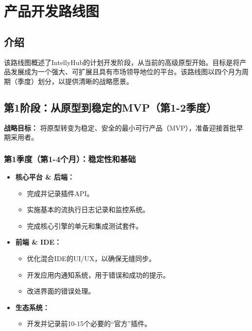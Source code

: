 \documentclass[11pt, a4paper, oneside]{article}
\begin{document}
\section{产品开发路线图} %
\subsection*{介绍}
该路线图概述了IntellyHub的计划开发阶段，从当前的高级原型开始。目标是将产品发展成为一个强大、可扩展且具有市场领导地位的平台。该路线图以四个月为周期（季度）划分，以提供清晰的战略愿景。

\clearpage

\subsection{第1阶段：从原型到稳定的MVP（第1-2季度）}
\textbf{战略目标：} 将原型转变为稳定、安全的最小可行产品（MVP），准备迎接首批早期采用者。

\subsubsection*{第1季度（第1-4个月）：稳定性和基础}
\begin{itemize}[leftmargin=*]
    \item \textbf{核心平台 \& 后端：}
    \begin{itemize}
        \item 完成并记录插件API。
        \item 实施基本的流执行日志记录和监控系统。
        \item 完成核心引擎的单元和集成测试套件。
    \end{itemize}
    \item \textbf{前端 \& IDE：}
    \begin{itemize}
        \item 优化混合IDE的UI/UX，以确保无缝同步。
        \item 开发应用内通知系统，用于错误和成功的提示。
        \item 改进界面的错误处理。



\end{itemize}
\item \textbf{生态系统：}
\begin{itemize}
    \item 开发并记录前10-15个必要的“官方”插件。
\end{itemize}
\end{itemize}
\end{document}
